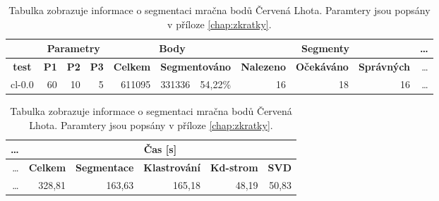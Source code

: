 \documentclass[11pt,twoside,a4paper]{book}
\begin{document}
\begin{table}[ht]
\resizebox{\textwidth}{!} {
\begin{tabular}{|r|r|r|r|r|r|r|r|r|r|r|}
\hline
\textbf{} & \multicolumn{ 3}{c|}{\textbf{Parametry}} & \multicolumn{ 3}{c|}{\textbf{Body}} & \multicolumn{ 3}{c|}{\textbf{Segmenty}}&\ldots \\ \hline
\multicolumn{1}{|c|}{\textbf{test}} & \textbf{P1} & \multicolumn{1}{c|}{\textbf{P2}} & \multicolumn{1}{c|}{\textbf{P3}} & \textbf{Celkem} & \multicolumn{ 2}{c|}{\textbf{Segmentováno}} & \textbf{Nalezeno} & \multicolumn{1}{c|}{\textbf{Očekáváno }} & \multicolumn{1}{c|}{\textbf{Správných}}&\ldots \\ \hline
cl-0.0 & \multicolumn{1}{r|}{60} & \multicolumn{1}{r|}{10} & \multicolumn{1}{r|}{5} & \multicolumn{1}{r|}{611095} & \multicolumn{1}{r|}{331336} & \multicolumn{1}{r|}{54,22\%} & \multicolumn{1}{r|}{16} & \multicolumn{1}{r|}{18} & \multicolumn{1}{r|}{16} &\ldots\\ \hline
\end{tabular}
}
\begin{flushright} \scalebox{0.9} {
\begin{tabular}{|r|r|r|r|r|r|}
\hline
\ldots & \multicolumn{ 5}{|c|}{\textbf{Čas [s]}} \\ \hline
\ldots &\textbf{Celkem} & \multicolumn{1}{c|}{\textbf{Segmentace}} & \multicolumn{1}{c|}{\textbf{Klastrování}} & \multicolumn{1}{c|}{\textbf{Kd-strom}} & \multicolumn{1}{c|}{\textbf{SVD}} \\ \hline
\ldots &\multicolumn{1}{|r|}{328,81} & \multicolumn{1}{r|}{163,63} & \multicolumn{1}{r|}{165,18} & \multicolumn{1}{r|}{48,19} & \multicolumn{1}{r|}{50,83} \\ \hline
\end{tabular}
}\end{flushright}

\caption{Tabulka zobrazuje informace o segmentaci mračna bodů Červená Lhota. Paramtery jsou popsány v příloze \ref{chap:zkratky}.} 
\label{table:test-cl}
\end{table}
\end{document}
